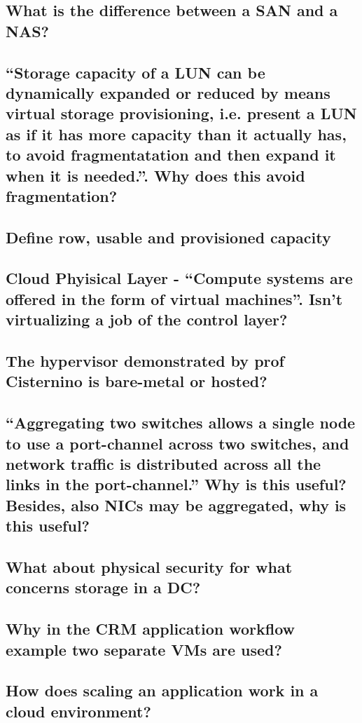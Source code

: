 \subsection{What is the difference between a SAN and a NAS?}



\subsection{``Storage \textbf{capacity} of a LUN can be dynamically expanded or reduced by means \textbf{virtual storage provisioning}, i.e. present a LUN as if it has more capacity than it actually has, to avoid fragmentatation and then expand it when it is needed.''. Why does this avoid fragmentation?}

\subsection{Define row, usable and provisioned capacity}

\subsection{Cloud Phyisical Layer - ``Compute systems are offered in the form of virtual machines''. Isn't virtualizing a job of the control layer?}

\subsection{The hypervisor demonstrated by prof Cisternino is bare-metal or hosted?}

\subsection{``Aggregating two switches allows a single node to use a port-channel across two switches, and network traffic is distributed across all the links in the port-channel.'' Why is this useful? Besides, also NICs may be aggregated, why is this useful?}

\subsection{What about physical security for what concerns storage in a DC?}

\subsection{Why in the CRM application workflow example two separate VMs are used?}

\subsection{How does scaling an application work in a cloud environment?}